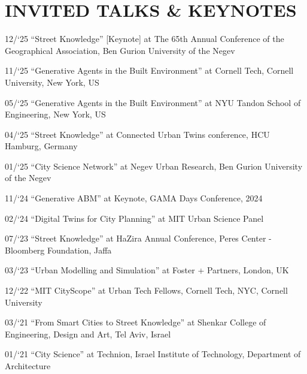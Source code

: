 \section*{INVITED TALKS \& KEYNOTES}

\begin{tablist}

    \item[12/`25] \tab \enquote{Street Knowledge} [Keynote] at
    {The 65th Annual Conference of the Geographical Association, Ben Gurion University of the Negev}

    \item[11/`25] \tab \enquote{Generative Agents in the Built Environment} at
    {Cornell Tech, Cornell University, New York, US}

    \item[05/`25] \tab \enquote{Generative Agents in the Built Environment} at
    {NYU Tandon School of Engineering, New York, US}

    \item[04/`25] \tab \enquote{Street Knowledge} at
    {Connected Urban Twins conference, HCU Hamburg, Germany}

    \item[01/`25] \tab \enquote{City Science Network} at
    {Negev Urban Research, Ben Gurion University of the Negev}

    \item[11/`24] \tab \enquote{Generative ABM} at
    {Keynote, GAMA Days Conference, 2024}

    \item[02/`24] \tab \enquote{Digital Twins for City Planning} at
    {MIT Urban Science Panel}

    \item[07/`23] \tab \enquote{Street Knowledge} at
    {HaZira Annual Conference, Peres Center - Bloomberg Foundation, Jaffa}

    \item[03/`23] \tab \enquote{Urban Modelling and Simulation} at
    {Foster + Partners, London, UK}

    \item[12/`22] \tab \enquote{MIT CityScope} at
    {Urban Tech Fellows, Cornell Tech, NYC, Cornell University}

    \item[03/`21] \tab \enquote{From Smart Cities to Street Knowledge} at
    {Shenkar College of Engineering, Design and Art, Tel Aviv, Israel}

    \item[01/`21] \tab \enquote{City Science} at
    {Technion, Israel Institute of Technology, Department of Architecture}


\end{tablist}
